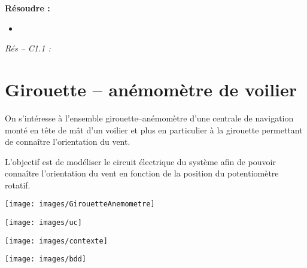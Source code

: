 \documentclass[10pt]{article}
\begin{document}






\begin{comp}
\noindent \textbf{Résoudre :} 
\begin{itemize}
\item 
\end{itemize}

\noindent \textit{Rés -- C1.1 :} 
\end{comp}

\section*{Girouette -- anémomètre de voilier}



\begin{minipage}[c]{.6\linewidth}
On s'intéresse à l'ensemble girouette--anémomètre d'une centrale de navigation monté en tête de mât d'un voilier et plus en particulier à la girouette permettant de connaître l'orientation du vent. 
\begin{obj}
L'objectif est de modéliser le circuit électrique du système afin de pouvoir connaître l'orientation du vent en fonction de la position du potentiomètre rotatif.
\end{obj}

\end{minipage} \hfill
\begin{minipage}[c]{.35\linewidth}
\begin{center}
\texttt{[image: images/GirouetteAnemometre]}
\end{center}
\end{minipage}

\vspace{.25cm}

\begin{minipage}[c]{.32\linewidth}
\begin{center}
\texttt{[image: images/uc]}
\end{center}
\end{minipage} \hfill
\begin{minipage}[c]{.32\linewidth}
\begin{center}
\texttt{[image: images/contexte]}
\end{center}
\end{minipage}  \hfill
\begin{minipage}[c]{.32\linewidth}
\begin{center}
\texttt{[image: images/bdd]}
\end{center}
\end{minipage} 
\end{document}
